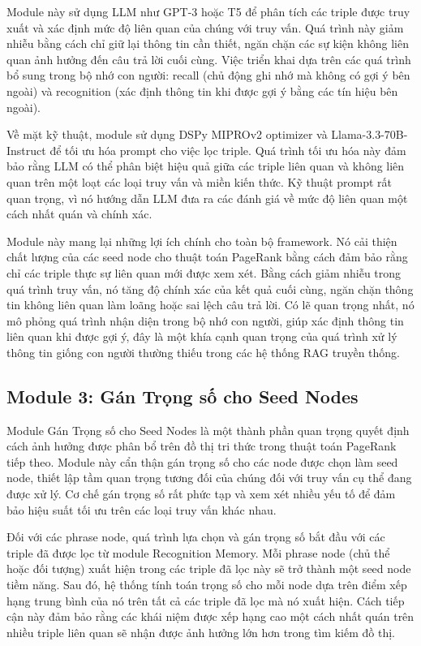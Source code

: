 \documentclass[../main.tex]{subfiles}
\begin{document}
Module này sử dụng LLM như GPT-3 hoặc T5 để phân tích các triple được truy xuất và xác định mức độ liên quan của chúng với truy vấn. Quá trình này giảm nhiễu bằng cách chỉ giữ lại thông tin cần thiết, ngăn chặn các sự kiện không liên quan ảnh hưởng đến câu trả lời cuối cùng. Việc triển khai dựa trên các quá trình bổ sung trong bộ nhớ con người: recall (chủ động ghi nhớ mà không có gợi ý bên ngoài) và recognition (xác định thông tin khi được gợi ý bằng các tín hiệu bên ngoài).

Về mặt kỹ thuật, module sử dụng DSPy MIPROv2 optimizer và Llama-3.3-70B-Instruct để tối ưu hóa prompt cho việc lọc triple. Quá trình tối ưu hóa này đảm bảo rằng LLM có thể phân biệt hiệu quả giữa các triple liên quan và không liên quan trên một loạt các loại truy vấn và miền kiến thức. Kỹ thuật prompt rất quan trọng, vì nó hướng dẫn LLM đưa ra các đánh giá về mức độ liên quan một cách nhất quán và chính xác.

Module này mang lại những lợi ích chính cho toàn bộ framework. Nó cải thiện chất lượng của các seed node cho thuật toán PageRank bằng cách đảm bảo rằng chỉ các triple thực sự liên quan mới được xem xét. Bằng cách giảm nhiễu trong quá trình truy vấn, nó tăng độ chính xác của kết quả cuối cùng, ngăn chặn thông tin không liên quan làm loãng hoặc sai lệch câu trả lời. Có lẽ quan trọng nhất, nó mô phỏng quá trình nhận diện trong bộ nhớ con người, giúp xác định thông tin liên quan khi được gợi ý, đây là một khía cạnh quan trọng của quá trình xử lý thông tin giống con người thường thiếu trong các hệ thống RAG truyền thống.

\subsection{Module 3: Gán Trọng số cho Seed Nodes}
Module Gán Trọng số cho Seed Nodes là một thành phần quan trọng quyết định cách ảnh hưởng được phân bổ trên đồ thị tri thức trong thuật toán PageRank tiếp theo. Module này cẩn thận gán trọng số cho các node được chọn làm seed node, thiết lập tầm quan trọng tương đối của chúng đối với truy vấn cụ thể đang được xử lý. Cơ chế gán trọng số rất phức tạp và xem xét nhiều yếu tố để đảm bảo hiệu suất tối ưu trên các loại truy vấn khác nhau.

Đối với các phrase node, quá trình lựa chọn và gán trọng số bắt đầu với các triple đã được lọc từ module Recognition Memory. Mỗi phrase node (chủ thể hoặc đối tượng) xuất hiện trong các triple đã lọc này sẽ trở thành một seed node tiềm năng. Sau đó, hệ thống tính toán trọng số cho mỗi node dựa trên điểm xếp hạng trung bình của nó trên tất cả các triple đã lọc mà nó xuất hiện. Cách tiếp cận này đảm bảo rằng các khái niệm được xếp hạng cao một cách nhất quán trên nhiều triple liên quan sẽ nhận được ảnh hưởng lớn hơn trong tìm kiếm đồ thị.
\end{document}
